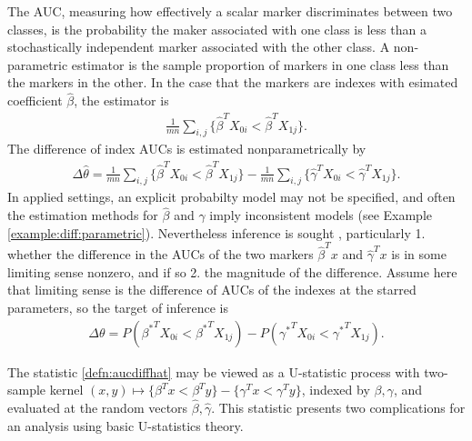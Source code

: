 \documentclass[12pt]{article}
\renewcommand{\P}{P}
\newcommand{\X}[1][]{X_{0#1}}
\newcommand{\Y}[1][]{X_{1#1}}
\renewcommand{\t}[1]{{#1}^T}
\renewcommand{\star}[1]{{#1}^\ast}
\newcommand{\m}{m}
\newcommand{\n}{n}
\newcommand{\auc}{\theta}
\newcommand{\aucdiff}{\Delta\auc}
\newcommand{\aucdiffhat}{\Delta\hat{\auc}}
\newcommand{\kernel}[2]{\{#1 < #2\}}
\theoremstyle{definition}
\newcommand{\comment}[1]{
  \iftoggle{commenttoggle}{
    {\normalsize{\color{red}{ #1}}\normalsize}
  }
  {}
}
\begin{document}
The AUC, measuring how effectively a scalar marker discriminates
between two classes, is the probability the maker associated with one
class is less than a stochastically independent marker associated with
the other class. A non-parametric estimator is the sample proportion
of markers in one class less than the markers in the other. In the
case that the markers are indexes with esimated coefficient
$\hat\beta$, the estimator is
\begin{align}
   \frac{1}{\m\n}\sum_{i,j}\kernel{\t{\hat\beta}\X[i]}{\t{\hat\beta}\Y[j]}.\label{defn:auchat}
\end{align}
The difference of index AUCs is  estimated nonparametrically by
\begin{align}
  \aucdiffhat=\frac{1}{\m\n}\sum_{i,j}\kernel{\t{\hat\beta}\X[i]}{\t{\hat\beta}\Y[j]}
  -  \frac{1}{\m\n}\sum_{i,j}\kernel{\t{\hat\gamma}\X[i]}{\t{\hat\gamma}\Y[j]} . \label{defn:aucdiffhat}
\end{align}
In applied settings, an explicit probabilty model may not be
specified, and often the estimation methods for $\hat\beta$ and
$\hat\gamma$ imply inconsistent
models (see Example \ref{example:diff:parametric}). %
 Nevertheless inference is
sought \comment{cite applied papers}, particularly 1. whether the difference
in the AUCs of the two markers $\t{\hat\beta} x$ and
$\t{\hat\gamma} x$ is in some limiting sense nonzero, and if so 2. the
magnitude of the difference. Assume here that limiting sense is the
difference of AUCs of the indexes at the starred parameters,
so the target of inference is%
\begin{align}
  \aucdiff=\P(\t{\star\beta}\X[i]<\t{\star\beta}\Y[j])
- \P(\t{\star\gamma}\X[i]<\t{\star\gamma}\Y[j]).\label{defn:aucdiff}
\end{align}

The statistic \eqref{defn:aucdiffhat} may be viewed as a U-statistic process with
two-sample kernel
$(x,y)\mapsto \kernel{\t\beta x}{\t\beta y} - \kernel{\t\gamma x }{
  \t\gamma y}$, indexed by $\beta,\gamma$, and evaluated at the random
vectors $\hat\beta,\hat\gamma$. This statistic presents two
complications for an analysis using basic U-statistics theory.
\end{document}
